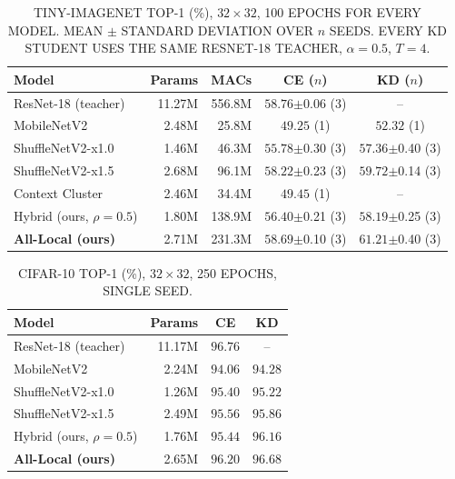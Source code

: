 \begin{table}[!t]
\renewcommand{\arraystretch}{1.15}
\caption{\uppercase{Tiny-ImageNet top-1 (\%), $32\times32$, 100 epochs for every model.
Mean $\pm$ standard deviation over $n$ seeds. Every KD student uses the same
ResNet-18 teacher, $\alpha = 0.5$, $T = 4$.}}
\label{tab:tin}
\centering
\footnotesize
\begin{tabular}{@{}lrrcc@{}}
\toprule
Model & Params & MACs & CE ($n$) & KD ($n$) \\
\midrule
ResNet-18 (teacher) & 11.27M & 556.8M & $58.76${\scriptsize$\pm$0.06} (3) & -- \\
MobileNetV2 \cite{mobilenetv2} & 2.48M & 25.8M & $49.25$ (1) & $52.32$ (1) \\
ShuffleNetV2-x1.0 & 1.46M & 46.3M & $55.78${\scriptsize$\pm$0.30} (3) & $57.36${\scriptsize$\pm$0.40} (3) \\
ShuffleNetV2-x1.5 & 2.68M & 96.1M & $58.22${\scriptsize$\pm$0.23} (3) & $59.72${\scriptsize$\pm$0.14} (3) \\
Context Cluster \cite{coc} & 2.46M & 34.4M & $49.45$ (1) & -- \\
Hybrid (ours, $\rho{=}0.5$) & 1.80M & 138.9M & $56.40${\scriptsize$\pm$0.21} (3) & $58.19${\scriptsize$\pm$0.25} (3) \\
\midrule
\textbf{All-Local (ours)} & 2.71M & 231.3M & $\mathbf{58.69}${\scriptsize$\pm$0.10} (3) & $\mathbf{61.21}${\scriptsize$\pm$0.40} (3) \\
\bottomrule
\end{tabular}
\end{table}

\begin{table}[!t]
\renewcommand{\arraystretch}{1.15}
\caption{\uppercase{CIFAR-10 top-1 (\%), $32\times32$, 250 epochs, single seed.}}
\label{tab:c10}
\centering
\footnotesize
\begin{tabular}{@{}lrcc@{}}
\toprule
Model & Params & CE & KD \\
\midrule
ResNet-18 (teacher) & 11.17M & $96.76$ & -- \\
MobileNetV2 & 2.24M & $94.06$ & $94.28$ \\
ShuffleNetV2-x1.0 & 1.26M & $95.40$ & $95.22$ \\
ShuffleNetV2-x1.5 & 2.49M & $95.56$ & $95.86$ \\
Hybrid (ours, $\rho{=}0.5$) & 1.76M & $95.44$ & $96.16$ \\
\midrule
\textbf{All-Local (ours)} & 2.65M & $\mathbf{96.20}$ & $\mathbf{96.68}$ \\
\bottomrule
\end{tabular}
\end{table}

